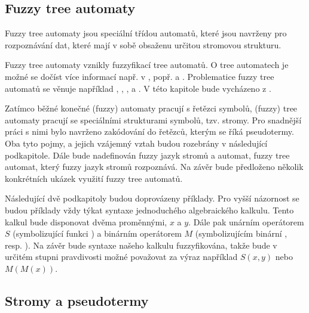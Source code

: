 \documentclass[a4paper,10pt]{article}
\begin{document}
\subsection{Fuzzy tree automaty}
Fuzzy tree automaty jsou speciální třídou automatů, které jsou navrženy pro rozpoznávání dat, které mají v sobě obsaženu určitou stromovou strukturu.

Fuzzy tree automaty vznikly fuzzyfikací  tree automatů. O  tree automatech je možné se dočíst více informací např. v \cite{Com+-TreeAutTecApp}, popř. \cite{Hua-SyntPattRecSeisOilExp} a \cite{Bez+-FuzModAlgPatRecImProc}. Problematice fuzzy tree automatů se věnuje například \cite{Lee-FuzTreAutSynPatRec}, \cite{MogZadAme-NewDirInFuzzTreeAut}, \cite{ChaJos-NoteFuzzTreeAut}, \cite{EsiLiu-FuzzTreeAut} a \cite{MorMal-FuzzyAutLang}. V této kapitole bude vycházeno z \cite{MorMal-FuzzyAutLang}.

Zatímco běžné konečné (fuzzy) automaty pracují s řetězci symbolů, (fuzzy) tree automaty pracují se speciálními strukturami symbolů, tzv. stromy. Pro snadnější práci s nimi bylo navrženo zakódování do řetězců, kterým se říká pseudotermy. Oba tyto pojmy, a jejich vzájemný vztah budou rozebrány v následující podkapitole. Dále bude nadefinován fuzzy jazyk stromů a automat, fuzzy tree automat, který fuzzy jazyk stromů rozpoznává. Na závěr bude předloženo několik konkrétních ukázek využití fuzzy tree automatů.

Následující dvě podkapitoly budou doprovázeny příklady. Pro vyšší názornost se budou příklady vždy týkat syntaxe jednoduchého algebraického kalkulu. Tento kalkul bude disponovat dvěma proměnnými, $x$ a $y$. Dále pak unárním operátorem $S$ (symbolizující funkci ) a binárním operátorem $M$ (symbolizujícím binární , resp. ). Na závěr bude syntaxe našeho kalkulu fuzzyfikována, takže bude v určitém stupni pravdivosti možné považovat za výraz například $S(x, y)$ nebo $M(M(x))$.

\subsection{Stromy a pseudotermy}
\end{document}
